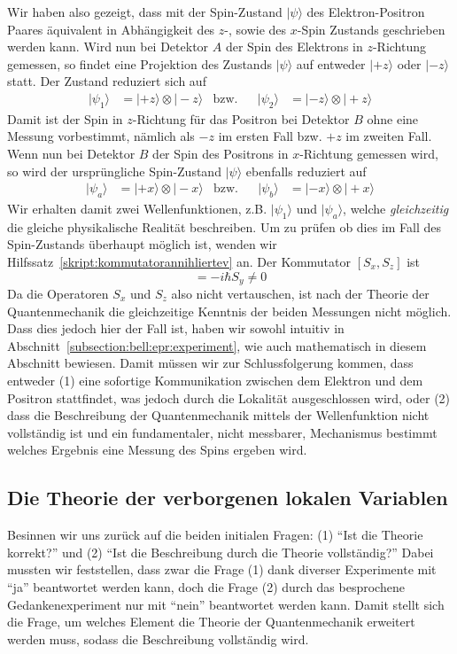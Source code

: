 \begin{refsection}
Wir haben also gezeigt, dass mit der Spin-Zustand $|\psi\rangle$ des
Elektron-Positron Paares \"aquivalent in Abh\"angigkeit des $z$-, sowie
des $x$-Spin Zustands geschrieben werden kann.
Wird nun bei Detektor $A$ der Spin des Elektrons in $z$-Richtung gemessen, 
so findet eine Projektion des Zustands $|\psi\rangle$ auf entweder
$|{+}z\rangle$ oder $|{-}z\rangle$ statt.
Der Zustand reduziert sich auf
\begin{align*}
    |\psi_{1}\rangle &= |{+}z\rangle \otimes |{-}z\rangle
    & \text{bzw.} && 
    |\psi_{2}\rangle &= |{-}z\rangle \otimes |{+}z\rangle
\end{align*}
Damit ist der Spin in $z$-Richtung f\"ur das Positron bei Detektor $B$ ohne
eine Messung vorbestimmt, n\"amlich als $-z$ im ersten Fall bzw. $+z$ im
zweiten Fall.
Wenn nun bei Detektor $B$ der Spin des Positrons in $x$-Richtung gemessen
wird, so wird der urspr\"ungliche Spin-Zustand $|\psi\rangle$
ebenfalls reduziert auf
\begin{align*}
    |\psi_{a}\rangle &= |{+}x\rangle \otimes |{-}x\rangle
    & \text{bzw.} && 
    |\psi_{b}\rangle &= |{-}x\rangle \otimes |{+}x\rangle
\end{align*}
Wir erhalten damit zwei Wellenfunktionen, z.B. $|\psi_{1}\rangle$ und 
$|\psi_{a}\rangle$, welche \emph{gleichzeitig} die gleiche 
physikalische Realit\"at beschreiben.
Um zu pr\"ufen ob dies im Fall des Spin-Zustands \"uberhaupt m\"oglich 
ist, wenden wir Hilfssatz~\ref{skript:kommutatorannihliertev} an.
Der Kommutator $[S_x,S_z]$ ist
\begin{equation}
    [S_x, S_z] =  -i \hbar S_y \neq 0
\end{equation}
Da die Operatoren $S_x$ und $S_z$ also nicht vertauschen, ist nach der Theorie
der Quantenmechanik die gleichzeitige Kenntnis der beiden Messungen nicht
m\"oglich.
Dass dies jedoch hier der Fall ist, haben wir sowohl intuitiv in
Abschnitt~\ref{subsection:bell:epr:experiment}, wie auch mathematisch in
diesem Abschnitt bewiesen. 
Damit m\"ussen wir zur Schlussfolgerung kommen, dass entweder 
(1) eine sofortige Kommunikation zwischen dem Elektron und dem Positron
stattfindet, was  jedoch durch die Lokalit\"at ausgeschlossen wird,
oder (2) dass die Beschreibung der Quantenmechanik mittels der Wellenfunktion
nicht  vollst\"andig ist und ein fundamentaler, nicht messbarer, Mechanismus
bestimmt welches Ergebnis eine Messung des Spins ergeben wird.


\subsection{Die Theorie der verborgenen lokalen Variablen}
Besinnen wir uns zur\"uck auf die beiden initialen Fragen: 
(1) \enquote{Ist die Theorie korrekt?} und 
(2) \enquote{Ist die Beschreibung durch die Theorie vollst\"andig?}
Dabei mussten wir feststellen, dass zwar die Frage (1) dank diverser
Experimente mit \enquote{ja} beantwortet werden kann, doch die Frage (2) 
durch das besprochene Gedankenexperiment nur mit \enquote{nein} beantwortet
werden kann. 
Damit stellt sich die Frage, um welches Element die Theorie der Quantenmechanik
erweitert werden muss, sodass die Beschreibung vollst\"andig wird.


\end{refsection}
